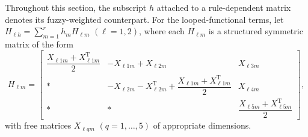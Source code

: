 \documentclass[preprint,review,fleqn,sort&compress,3p]{elsarticle}
\theoremstyle{definition} %
\theoremstyle{definition}%
\begin{document}
Throughout this section, the subscript $h$ attached to a rule-dependent matrix denotes its fuzzy-weighted counterpart. For the looped-functional terms, let $H_{\ell h}=\sum_{m=1}^{r}h_mH_{\ell m}$ $(\ell=1,2)$, where each $H_{\ell m}$ is a structured symmetric matrix of the form
\begin{equation}\label{eq:H_structure}
	H_{\ell m}=
	\begin{bmatrix}
		\dfrac{X_{\ell 1m}+X_{\ell 1m}^{\mathrm T}}{2}
		&
		-X_{\ell 1m}+X_{\ell 2m}
		&
		X_{\ell 3m}
		\\[1.2ex]
		*
		&
		-X_{\ell 2m}-X_{\ell 2m}^{\mathrm T}
		+\dfrac{X_{\ell 1m}+X_{\ell 1m}^{\mathrm T}}{2}
		&
		X_{\ell 4m}
		\\[1.2ex]
		*
		&
		*
		&
		\dfrac{X_{\ell 5m}+X_{\ell 5m}^{\mathrm T}}{2}
	\end{bmatrix},
\end{equation}
with free matrices $X_{\ell qm}$ $(q=1,\ldots,5)$ of appropriate dimensions.
\end{document}
